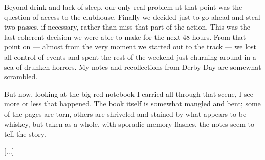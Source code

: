 \documentclass[10pt,a4paper]{article}
\begin{document}
Beyond drink and lack of sleep, our only real problem at that point was the question of access to the clubhouse. Finally we decided just to go ahead and steal two passes, if necessary, rather than miss that part of the action. This was the last coherent decision we were able to make for the next 48 hours. From that point on — almost from the very moment we started out to the track — we lost all control of events and spent the rest of the weekend just churning around in a sea of drunken horrors. My notes and recollections from Derby Day are somewhat scrambled.

But now, looking at the big red notebook I carried all through that scene, I see more or less that happened. The book itself is somewhat mangled and bent; some of the pages are torn, others are shriveled and stained by what appears to be whiskey, but taken as a whole, with sporadic memory flashes, the notes seem to tell the story.

[...]
\end{document}
